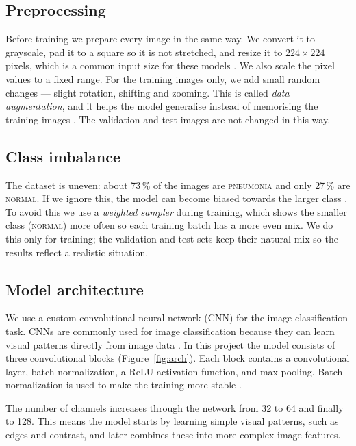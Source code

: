 \documentclass[10pt,twocolumn]{article}
\begin{document}
\subsection{Preprocessing}
\label{sec:preproc}
Before training we prepare every image in the same way. We convert it to
grayscale, pad it to a square so it is not stretched, and resize it to
$224\times224$ pixels, which is a common input size for these models
\cite{he2016resnet}. We also scale the pixel values to a fixed range. For the
training images only, we add small random changes --- slight rotation, shifting
and zooming. This is called \emph{data augmentation}, and it helps the model
generalise instead of memorising the training images \cite{shorten2019augment}.
The validation and test images are not changed in this way.

\subsection{Class imbalance}
\label{sec:imbalance}
The dataset is uneven: about 73\,\% of the images are \textsc{pneumonia} and only
27\,\% are \textsc{normal}. If we ignore this, the model can become biased towards
the larger class \cite{he2009imbalanced,krawczyk2016imbalanced}. To avoid this we
use a \emph{weighted sampler} during training, which shows the smaller class
(\textsc{normal}) more often so each training batch has a more even mix. We do
this only for training; the validation and test sets keep their natural mix so the
results reflect a realistic situation.

\subsection{Model architecture}
\label{sec:model}
We use a custom convolutional neural network (CNN) for the image classification
task. CNNs are commonly used for image classification because they can learn
visual patterns directly from image data
\cite{lecun1998gradient,krizhevsky2012imagenet}. In this project the model
consists of three convolutional blocks (Figure~\ref{fig:arch}). Each block
contains a convolutional layer, batch normalization, a ReLU activation function,
and max-pooling. Batch normalization is used to make the training more stable
\cite{ioffe2015batchnorm}.

The number of channels increases through the network from 32 to 64 and finally to
128. This means the model starts by learning simple visual patterns, such as
edges and contrast, and later combines these into more complex image features.
\end{document}
